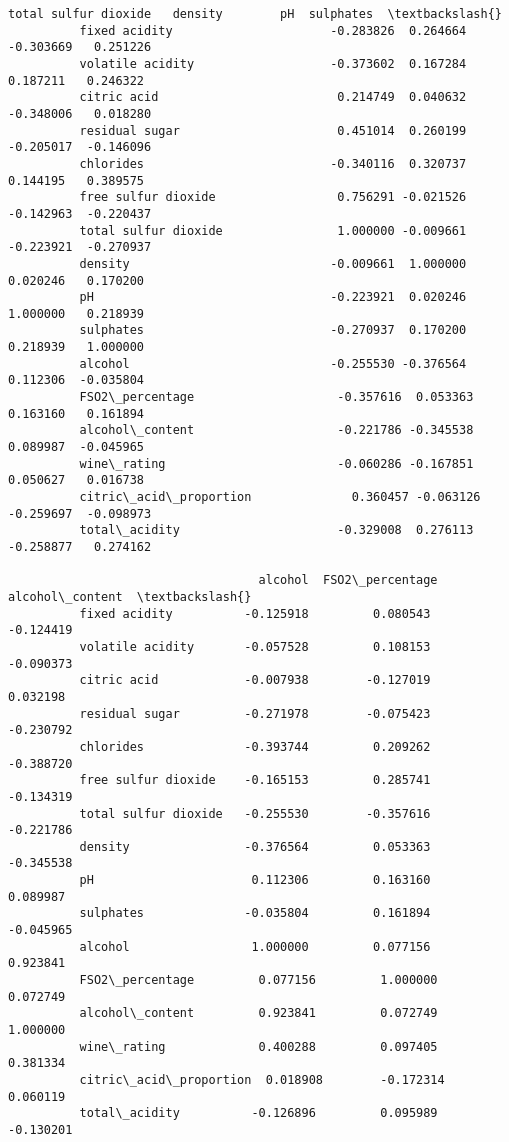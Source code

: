 \documentclass[11pt]{article}
\begin{document}
\begin{Verbatim}[commandchars=\\\{\}]
                                  total sulfur dioxide   density        pH  sulphates  \textbackslash{}
          fixed acidity                      -0.283826  0.264664 -0.303669   0.251226   
          volatile acidity                   -0.373602  0.167284  0.187211   0.246322   
          citric acid                         0.214749  0.040632 -0.348006   0.018280   
          residual sugar                      0.451014  0.260199 -0.205017  -0.146096   
          chlorides                          -0.340116  0.320737  0.144195   0.389575   
          free sulfur dioxide                 0.756291 -0.021526 -0.142963  -0.220437   
          total sulfur dioxide                1.000000 -0.009661 -0.223921  -0.270937   
          density                            -0.009661  1.000000  0.020246   0.170200   
          pH                                 -0.223921  0.020246  1.000000   0.218939   
          sulphates                          -0.270937  0.170200  0.218939   1.000000   
          alcohol                            -0.255530 -0.376564  0.112306  -0.035804   
          FSO2\_percentage                    -0.357616  0.053363  0.163160   0.161894   
          alcohol\_content                    -0.221786 -0.345538  0.089987  -0.045965   
          wine\_rating                        -0.060286 -0.167851  0.050627   0.016738   
          citric\_acid\_proportion              0.360457 -0.063126 -0.259697  -0.098973   
          total\_acidity                      -0.329008  0.276113 -0.258877   0.274162   
          
                                   alcohol  FSO2\_percentage  alcohol\_content  \textbackslash{}
          fixed acidity          -0.125918         0.080543        -0.124419   
          volatile acidity       -0.057528         0.108153        -0.090373   
          citric acid            -0.007938        -0.127019         0.032198   
          residual sugar         -0.271978        -0.075423        -0.230792   
          chlorides              -0.393744         0.209262        -0.388720   
          free sulfur dioxide    -0.165153         0.285741        -0.134319   
          total sulfur dioxide   -0.255530        -0.357616        -0.221786   
          density                -0.376564         0.053363        -0.345538   
          pH                      0.112306         0.163160         0.089987   
          sulphates              -0.035804         0.161894        -0.045965   
          alcohol                 1.000000         0.077156         0.923841   
          FSO2\_percentage         0.077156         1.000000         0.072749   
          alcohol\_content         0.923841         0.072749         1.000000   
          wine\_rating             0.400288         0.097405         0.381334   
          citric\_acid\_proportion  0.018908        -0.172314         0.060119   
          total\_acidity          -0.126896         0.095989        -0.130201   
          

\end{Verbatim}
\end{document}
